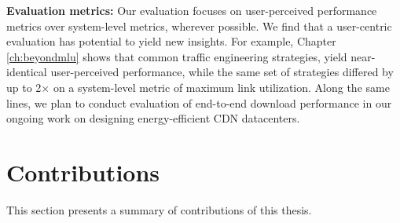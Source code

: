 \textbf{Evaluation metrics:} Our evaluation focuses on user-perceived performance metrics over system-level metrics, wherever possible. We find that a user-centric evaluation has potential to yield new insights. For example, Chapter \ref{ch:beyondmlu} shows that common traffic engineering strategies, yield near-identical user-perceived performance, while the same set of strategies differed by up to 2$\times$ on a system-level metric of maximum link utilization. Along the same lines, we plan to conduct evaluation of end-to-end download performance in our ongoing work on designing energy-efficient CDN datacenters.

%
%

\section{Contributions}

This section presents a summary of contributions of this thesis. 


